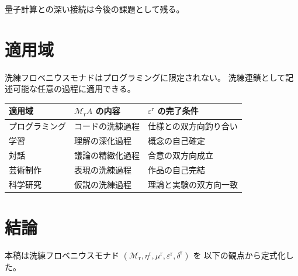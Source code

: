 \documentclass[11pt,a4paper]{article}
\theoremstyle{definition}
\newcommand{\Mr}{\mathcal{M}_{\mathrm{r}}}
\newcommand{\etar}{\eta^{\mathrm{r}}}
\newcommand{\mur}{\mu^{\mathrm{r}}}
\newcommand{\epsr}{\varepsilon^{\mathrm{r}}}
\newcommand{\deltar}{\delta^{\mathrm{r}}}
\begin{document}
量子計算との深い接続は今後の課題として残る。

\section{適用域}

洗練フロベニウスモナドはプログラミングに限定されない。
洗練連鎖として記述可能な任意の過程に適用できる。

\begin{center}
\begin{tabular}{lll}
\hline
\textbf{適用域} & \textbf{$\Mr A$ の内容} & \textbf{$\epsr$ の完了条件} \\
\hline
プログラミング & コードの洗練過程 & 仕様との双方向釣り合い \\
学習 & 理解の深化過程 & 概念の自己確定 \\
対話 & 議論の精緻化過程 & 合意の双方向成立 \\
芸術制作 & 表現の洗練過程 & 作品の自己完結 \\
科学研究 & 仮説の洗練過程 & 理論と実験の双方向一致 \\
\hline
\end{tabular}
\end{center}

\section{結論}

本稿は洗練フロベニウスモナド $(\Mr, \etar, \mur, \epsr, \deltar)$ を
以下の観点から定式化した。
\end{document}
